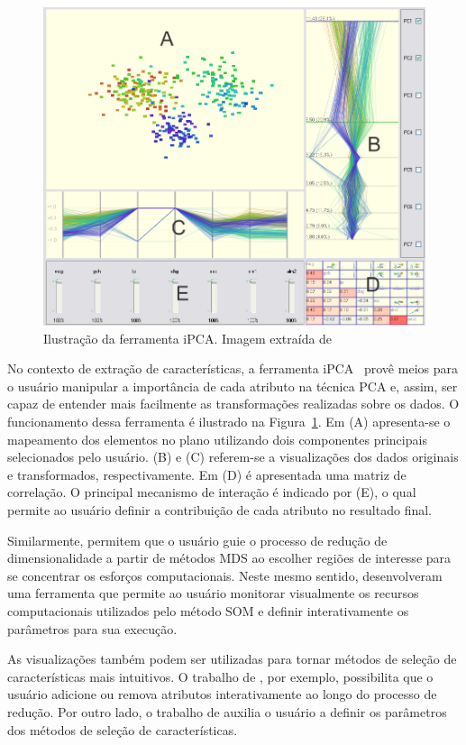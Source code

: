\begin{figure}[h!]
    \centering
    \includegraphics[width=12cm]{images/ipca.png}
    \caption[iPCA]{Ilustração da ferramenta iPCA. Imagem
    extraída de ~\cite{Jeong2009}}
    \label{fig:ipca}
\end{figure}

No contexto de extração de características, a ferramenta
iPCA~\cite{Jeong2009} provê meios para o usuário manipular a
importância de cada atributo na técnica PCA e, assim, ser
capaz de entender mais facilmente as transformações
realizadas sobre os dados. O funcionamento dessa ferramenta
é ilustrado na Figura~\ref{fig:ipca}. Em (A) apresenta-se o
mapeamento dos elementos no plano utilizando dois
componentes principais selecionados pelo usuário. (B) e (C)
referem-se a visualizações dos dados originais e
transformados, respectivamente. Em (D) é apresentada uma
matriz de correlação. O principal mecanismo de interação é
indicado por (E), o qual permite ao usuário definir a
contribuição de cada atributo no resultado final.

Similarmente, \citet{Williams2004}
permitem que o usuário guie o processo de redução de
dimensionalidade a partir de métodos MDS ao escolher regiões
de interesse para se concentrar os esforços computacionais.
Neste mesmo sentido, \citet{Schreck2008} desenvolveram uma
ferramenta que permite ao usuário monitorar visualmente os
recursos computacionais utilizados pelo método SOM e definir
interativamente os parâmetros para sua execução.

As visualizações também podem ser utilizadas para tornar
métodos de seleção de características mais intuitivos. O
trabalho de \citet{Dy2000}, por exemplo, possibilita que o
usuário adicione ou remova atributos interativamente ao
longo do processo de redução. Por outro lado, o trabalho de
\citet{Brandoli2010} auxilia o usuário a definir os
parâmetros dos métodos de seleção de características.

